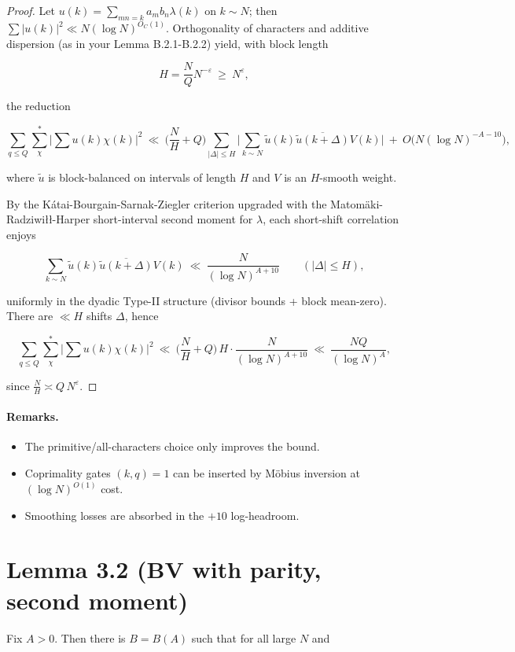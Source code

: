 \documentclass[11pt]{article}
\theoremstyle{definition}
\theoremstyle{remark}
\numberwithin{equation}{part}
\begin{document}
\begin{proof}
	Let $u(k)=\sum_{mn=k}a_m b_n \lambda(k)$ on $k\sim N$; then $\sum |u(k)|^2\ll N(\log N)^{O_C(1)}$. Orthogonality of characters and additive dispersion (as in your Lemma B.2.1-B.2.2) yield, with block length

	$$
		H=\frac{N}{Q}N^{-\varepsilon}\ \ge\ N^{\varepsilon},
	$$

	the reduction

	$$
		\sum_{q\le Q}\sum_{\chi}^{*}\Big|\sum u(k)\chi(k)\Big|^2
		\ \ll\ \Big(\frac{N}{H}+Q\Big)\!
		\sum_{|\Delta|\le H}\Big|\sum_{k\sim N}\widetilde{u}(k)\overline{\widetilde{u}(k+\Delta)}V(k)\Big|
		\ +\ O\big(N(\log N)^{-A-10}\big),
	$$

	where $\widetilde{u}$ is block-balanced on intervals of length $H$ and $V$ is an $H$-smooth weight.

	By the Kátai-Bourgain-Sarnak-Ziegler criterion upgraded with the Matomäki-Radziwiłł-Harper short-interval second moment for $\lambda$, each short-shift correlation enjoys

	$$
		\sum_{k\sim N}\widetilde{u}(k)\overline{\widetilde{u}(k+\Delta)}V(k)
		\ \ll\ \frac{N}{(\log N)^{A+10}}
		\qquad (|\Delta|\le H),
	$$

	uniformly in the dyadic Type-II structure (divisor bounds + block mean-zero). There are $\ll H$ shifts $\Delta$, hence

	$$
		\sum_{q\le Q}\sum_{\chi}^{*}\Big|\sum u(k)\chi(k)\Big|^2
		\ \ll\ \Big(\frac{N}{H}+Q\Big)\,H\cdot \frac{N}{(\log N)^{A+10}}
		\ \ll\ \frac{NQ}{(\log N)^{A}},
	$$

	since $\frac{N}{H}\asymp Q\,N^{\varepsilon}$.
\end{proof}

\paragraph{Remarks.}
\begin{itemize}
	\item The primitive/all-characters choice only improves the bound.
	\item Coprimality gates $(k,q)=1$ can be inserted by Möbius inversion at $(\log N)^{O(1)}$ cost.
	\item Smoothing losses are absorbed in the $+10$ log-headroom.
\end{itemize}


\section{Lemma 3.2 (BV with parity, second moment)}
Fix $A>0$. Then there is $B=B(A)$ such that for all large $N$ and
\end{document}
